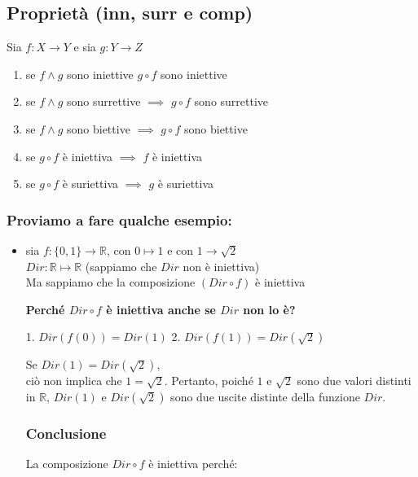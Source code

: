 \documentclass[article,12pt]{book}
\begin{document}
\begin{enumerate}
{\begin{enumerate}
\end{enumerate}

\newpage
\subsection{Proprietà (inn, surr e comp)}
Sia $f : X \rightarrow Y$ e sia $g : Y \rightarrow Z$
    \begin{enumerate}
        \item se $f \land g$ sono iniettive \implies $g \circ f$ sono iniettive
        \item se $f \land g$ sono surrettive $\implies$ $g \circ f$ sono surrettive
        \item se $f \land g$ sono biettive $\implies$ $g \circ f$ sono biettive
        \item se $g \circ f$ è iniettiva $\implies$ $f$ è iniettiva
        \item se $g \circ f$ è suriettiva $\implies$ $g$ è suriettiva
    \end{enumerate}
\subsubsection{Proviamo a fare qualche esempio:}
    \begin{itemize}
        \item sia $f : \{0,1 \} \rightarrow \mathbb{R}$, con $0 \mapsto 1$ e con $1 \rightarrow \sqrt{2}$ \\
        $Dir : \mathbb{R} \mapsto \mathbb{R}$ (sappiamo che $Dir$ non è iniettiva) \\[2EX]
        Ma sappiamo che la composizione $(Dir \circ f)$ è iniettiva

\textbf{Perché \( Dir \circ f \) è iniettiva anche se \( Dir \) non lo è?}

1. \( Dir(f(0)) = Dir(1) \)
2. \( Dir(f(1)) = Dir(\sqrt{2}) \)

Se \( Dir(1) = Dir(\sqrt{2}) \), \\
ciò non implica che \( 1 = \sqrt{2} \). Pertanto, poiché \( 1 \) e \( \sqrt{2} \) sono due valori distinti in \( \mathbb{R} \), \( Dir(1) \) e \( Dir(\sqrt{2}) \) sono due uscite distinte della funzione \( Dir \).

\subsubsection{Conclusione}

La composizione \( Dir \circ f \) è iniettiva perché:


\end{itemize}}
\end{enumerate}
\end{document}

